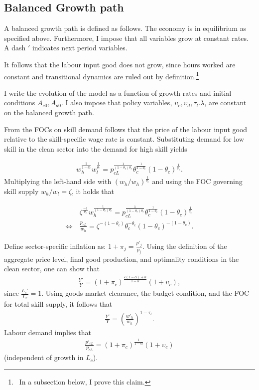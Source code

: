 \subsection{Balanced Growth path}
A balanced growth path  is defined as follows. The economy is in equilibrium as specified above. Furthermore, I impose that all variables grow at constant rates. A dash $'$ indicates next period variables. 

It follows that the labour input good does not grow, since hours worked are constant and transitional dynamics are ruled out by definition.\footnote{\ In a subsection below, I prove this claim.}

I write the evolution of the model as a function of growth rates and initial conditions $A_{c0}, A_{d0}$. I also impose that policy variables, $\upsilon_{c}, \upsilon_{d}, \tau_l. \lambda$, are constant on the balanced growth path. 

From the FOCs on skill demand follows that the price of the labour input good relative to the skill-specific wage rate is constant. Substituting demand for low skill in the clean sector into the demand for high skill yields

\begin{align*}
 w_{h}^{\frac{1}{1-\theta_c}}w_l^{\frac{1}{\theta_c}}= p_{cL}^\frac{1}{(1-\theta_c)\theta_c}\theta_c^\frac{1}{1-\theta_c}(1-\theta_c)^\frac{1}{\theta_c}.
\end{align*}
Multiplying the left-hand side with $(w_h/w_h)^\frac{1}{\theta_c}$ and
using the FOC governing skill supply $w_h/w_l=\zeta$, it holds that

\begin{align}\label{eq:constant}
& \zeta^\frac{-1}{\theta_c}w_h^\frac{1}{(1-\theta_c)\theta_c}= p_{cL}^\frac{1}{(1-\theta_c)\theta_c}\theta_c^\frac{1}{1-\theta_c}(1-\theta_c)^\frac{1}{\theta_c}\nonumber\\
	\Leftrightarrow\ & \frac{p_{cL}}{w_h}= \zeta^{-(1-\theta_c)}\theta_c^{-\theta_c}(1-\theta_c)^{-(1-\theta_c)}.
\end{align}
\noindent {}

Define sector-specific inflation as: $1+\pi_{j}=\frac{p'_j}{p_j}$.
Using the definition of the aggregate price level, final good production, and optimality conditions in the clean sector, one can show that 
\begin{align*}
\frac{Y'}{Y}= (1+\pi_c)^{\frac{\varepsilon(1-\alpha)+\alpha}{1-\alpha}}(1+\upsilon_{c}),
\end{align*}
since $\frac{L_{c}'}{L_c}=1$.
Using goods market clearance, the budget condition, and the FOC for total skill supply, it follows that 
\begin{align*}
\frac{Y'}{Y}= \left(\frac{w'_h}{w_h}\right)^{1-\tau_l}.
\end{align*}
Labour demand implies that 
\begin{align}\label{eq:labour income}
\frac{p'_{cL}}{p_{cL}}= (1+\pi_c)^\frac{1}{1-\alpha}(1+\upsilon_{c})
\end{align}
(independent of growth in $L_c$).


